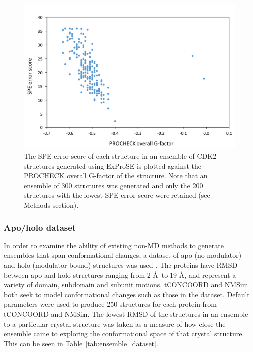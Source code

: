 \begin{figure}
\centering

\includegraphics[width=\textwidth]{figures/score_procheck/score_procheck}

\caption{The SPE error score of each structure in an ensemble of CDK2 structures generated using ExProSE is plotted against the PROCHECK overall G-factor of the structure.
Note that an ensemble of 300 structures was generated and only the 200 structures with the lowest SPE error score were retained (see Methods section).}

\label{fig:score_procheck}
\end{figure}


\subsubsection{Apo/holo dataset}

In order to examine the ability of existing non-MD methods to generate ensembles that span conformational changes, a dataset of apo (no modulator) and holo (modulator bound) structures was used \cite{Atilgan2010}.
The proteins have RMSD between apo and holo structures ranging from 2 \AA\ to 19 \AA, and represent a variety of domain, subdomain and subunit motions.
tCONCOORD \cite{Seeliger2007} and NMSim \cite{Kruger2012} both seek to model conformational changes such as those in the dataset.
Default parameters were used to produce 250 structures for each protein from tCONCOORD and NMSim.
The lowest RMSD of the structures in an ensemble to a particular crystal structure was taken as a measure of how close the ensemble came to exploring the conformational space of that crystal structure.
This can be seen in Table~\ref{tab:ensemble_dataset}.

